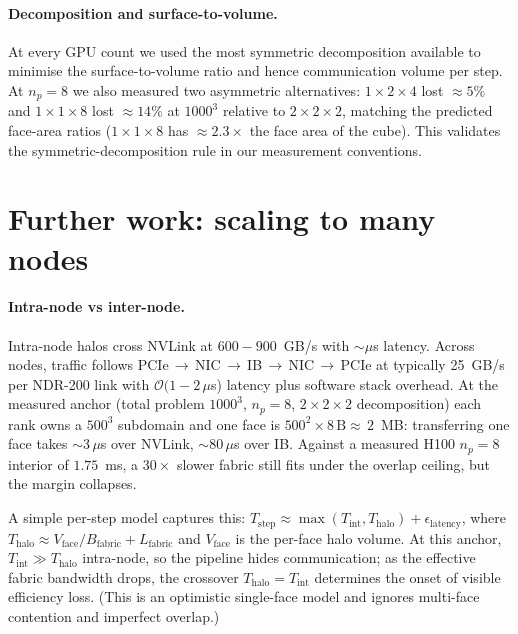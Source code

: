 \documentclass[10pt,a4paper]{article}
\begin{document}
\paragraph{Decomposition and surface-to-volume.}
At every GPU count we used the most symmetric decomposition available to minimise the surface-to-volume ratio and hence communication volume per step. At $n_p{=}8$ we also measured two asymmetric alternatives: $1{\times}2{\times}4$ lost $\approx\!5\%$ and $1{\times}1{\times}8$ lost $\approx\!14\%$ at $1000^3$ relative to $2{\times}2{\times}2$, matching the predicted face-area ratios ($1{\times}1{\times}8$ has $\approx\!2.3\times$ the face area of the cube). This validates the symmetric-decomposition rule in our measurement conventions.

\section{Further work: scaling to many nodes}
\label{sec:further}

\paragraph{Intra-node vs inter-node.}
Intra-node halos cross NVLink at $600\!-\!900$~GB/s with $\sim\!\mu$s latency. Across nodes, traffic follows PCIe\,$\to$\,NIC\,$\to$\,IB\,$\to$\,NIC\,$\to$\,PCIe at typically 25~GB/s per NDR-200 link with $\mathcal{O}(1\!-\!2\,\mu$s) latency plus software stack overhead. At the measured anchor (total problem $1000^3$, $n_p{=}8$, $2{\times}2{\times}2$ decomposition) each rank owns a $500^3$ subdomain and one face is $500^2{\times}8\,\text{B}{\approx}\,2$~MB: transferring one face takes $\sim\!3\,\mu$s over NVLink, $\sim\!80\,\mu$s over IB. Against a measured H100 $n_p{=}8$ interior of $1.75$~ms, a $30\times$ slower fabric still fits under the overlap ceiling, but the margin collapses.

A simple per-step model captures this: $T_{\text{step}} \approx \max(T_{\text{int}}, T_{\text{halo}}) + \epsilon_{\text{latency}}$, where $T_{\text{halo}} \approx V_{\text{face}}/B_{\text{fabric}} + L_{\text{fabric}}$ and $V_{\text{face}}$ is the per-face halo volume. At this anchor, $T_{\text{int}} \gg T_{\text{halo}}$ intra-node, so the pipeline hides communication; as the effective fabric bandwidth drops, the crossover $T_{\text{halo}}{=}T_{\text{int}}$ determines the onset of visible efficiency loss. (This is an optimistic single-face model and ignores multi-face contention and imperfect overlap.)
\end{document}
